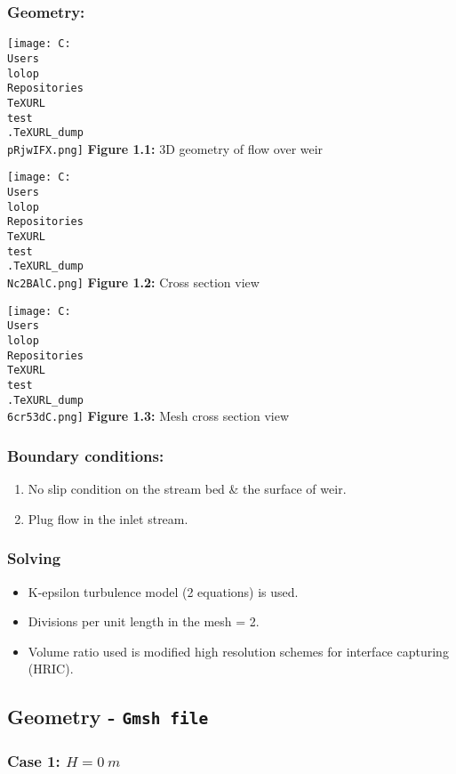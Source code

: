\documentclass[11pt]{article}
\providecommand{\tightlist}{%
      \setlength{\itemsep}{0pt}\setlength{\parskip}{0pt}}
\begin{document}
\hypertarget{geometry}{%
\subsubsection{Geometry:}\label{geometry}}

\texttt{[image: C:\\Users\\lolop\\Repositories\\TeXURL\\test\\.TeXURL\_dump\\pRjwIFX.png]} \textbf{Figure 1.1:}
3D geometry of flow over weir

\texttt{[image: C:\\Users\\lolop\\Repositories\\TeXURL\\test\\.TeXURL\_dump\\Nc2BAlC.png]} \textbf{Figure 1.2:}
Cross section view

\texttt{[image: C:\\Users\\lolop\\Repositories\\TeXURL\\test\\.TeXURL\_dump\\6cr53dC.png]} \textbf{Figure 1.3:}
Mesh cross section view

\hypertarget{boundary-conditions}{%
\subsubsection{Boundary conditions:}\label{boundary-conditions}}

\begin{enumerate}
\def\labelenumi{\arabic{enumi}.}
\tightlist
\item
  No slip condition on the stream bed \& the surface of weir.
\item
  Plug flow in the inlet stream.
\end{enumerate}

\hypertarget{solving}{%
\subsubsection{Solving}\label{solving}}

\begin{itemize}
\tightlist
\item
  K-epsilon turbulence model (2 equations) is used.
\item
  Divisions per unit length in the mesh = 2.
\item
  Volume ratio used is modified high resolution schemes for interface
  capturing (HRIC).
\end{itemize}

\hypertarget{geometry---gmsh-file}{%
\subsection{\texorpdfstring{Geometry -
\texttt{Gmsh\ file}}{Geometry - Gmsh file}}\label{geometry---gmsh-file}}

\hypertarget{case-1-h-0-m}{%
\subsubsection{\texorpdfstring{Case 1:
\(H = 0\ m\)}{Case 1: H = 0\textbackslash{} m}}\label{case-1-h-0-m}}
\end{document}

